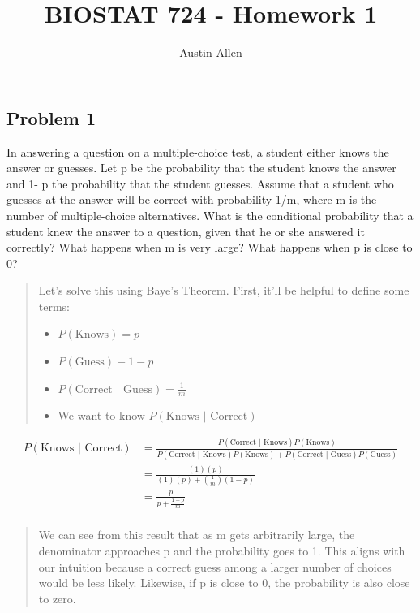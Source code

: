 \documentclass[
  letterpaper,
  DIV=11,
  numbers=noendperiod]{scrartcl}
\title{BIOSTAT 724 - Homework 1}
\author{Austin Allen}
\date{}
\providecommand{\tightlist}{%
  \setlength{\itemsep}{0pt}\setlength{\parskip}{0pt}}\usepackage{longtable,booktabs,array}
\begin{document}
\maketitle

\subsection{Problem 1}\label{problem-1}

In answering a question on a multiple-choice test, a student either
knows the answer or guesses. Let p be the probability that the student
knows the answer and 1- p the probability that the student guesses.
Assume that a student who guesses at the answer will be correct with
probability 1/m, where m is the number of multiple-choice alternatives.
What is the conditional probability that a student knew the answer to a
question, given that he or she answered it correctly? What happens when
m is very large? What happens when p is close to 0?

\begin{quote}
Let's solve this using Baye's Theorem. First, it'll be helpful to define
some terms:

\begin{itemize}
\tightlist
\item
  \(P(\text{Knows}) = p\)
\item
  \(P(\text{Guess}) - 1 - p\)
\item
  \(P(\text{Correct | Guess}) = \frac{1}{m}\)
\item
  We want to know \(P(\text{Knows | Correct})\)
\end{itemize}
\end{quote}

\begin{align*}
P(\text{Knows | Correct}) &= \frac{P(\text{Correct | Knows})P(\text{Knows})}{P(\text{Correct | Knows})P(\text{Knows}) + P(\text{Correct | Guess})P(\text{Guess})}\\
&= \frac{(1)(p)}{(1)(p) + (\frac{1}{m})(1 - p)}\\
&= \frac{p}{p + \frac{1 - p}{m}}\\
\end{align*}

\begin{quote}
We can see from this result that as m gets arbitrarily large, the
denominator approaches p and the probability goes to 1. This aligns with
our intuition because a correct guess among a larger number of choices
would be less likely. Likewise, if p is close to 0, the probability is
also close to zero.
\end{quote}
\end{document}
